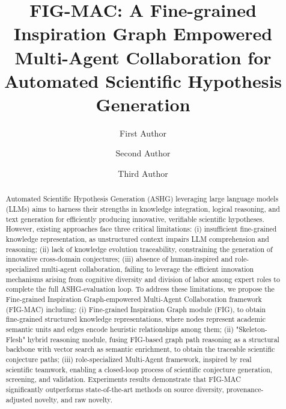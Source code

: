 \documentclass[runningheads]{llncs}
\begin{document}
\title{FIG-MAC: A Fine-grained Inspiration Graph Empowered Multi-Agent Collaboration for Automated Scientific Hypothesis Generation}


\author{First Author \and Second Author \and Third Author}



\maketitle

\begin{abstract}
Automated Scientific Hypothesis Generation (ASHG) leveraging large language models (LLMs) aims to harness their strengths in knowledge integration, logical reasoning, and text generation for efficiently producing innovative, verifiable scientific hypotheses. However, existing approaches face three critical limitations: (i) insufficient fine-grained knowledge representation, as unstructured context impairs LLM comprehension and reasoning; (ii) lack of knowledge evolution traceability, constraining the generation of innovative cross-domain conjectures; (iii) absence of human-inspired and role-specialized multi-agent collaboration, failing to leverage the efficient innovation mechanisms arising from cognitive diversity and division of labor among expert roles to complete the full ASHG-evaluation loop. To address these limitations, we propose the Fine-grained Inspiration Graph-empowered Multi-Agent Collaboration framework (FIG-MAC) including: (i) Fine-grained Inspiration Graph module (FIG), to obtain fine-grained structured knowledge representations, where nodes represent academic semantic units and edges encode heuristic relationships among them; (ii) "Skeleton-Flesh" hybrid reasoning module, fusing FIG-based graph path reasoning as a structural backbone with vector search as semantic enrichment, to obtain the traceable scientific conjecture paths; (iii) role-specialized Multi-Agent framework, inspired by real scientific teamwork, enabling a closed-loop process of scientific conjecture generation, screening, and validation. Experiments results demonstrate that FIG-MAC significantly outperforms state-of-the-art methods on source diversity, provenance-adjusted novelty, and raw novelty.

\end{abstract}
\end{document}
